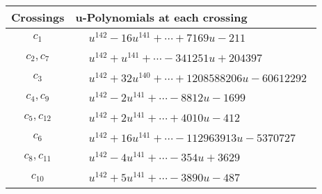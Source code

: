 \documentclass[1p]{elsarticle_modified}
\theoremstyle{definition}
\begin{document}
\begin{tabular}{m{50pt}|m{274pt}}
Crossings & \hspace{64pt}u-Polynomials at each crossing \\
\hline $$\begin{aligned}c_{1}\end{aligned}$$&$\begin{aligned}
&u^{142}-16 u^{141}+\cdots+7169 u-211
\end{aligned}$\\
\hline $$\begin{aligned}c_{2},c_{7}\end{aligned}$$&$\begin{aligned}
&u^{142}+u^{141}+\cdots-341251 u+204397
\end{aligned}$\\
\hline $$\begin{aligned}c_{3}\end{aligned}$$&$\begin{aligned}
&u^{142}+32 u^{140}+\cdots+1208588206 u-60612292
\end{aligned}$\\
\hline $$\begin{aligned}c_{4},c_{9}\end{aligned}$$&$\begin{aligned}
&u^{142}-2 u^{141}+\cdots-8812 u-1699
\end{aligned}$\\
\hline $$\begin{aligned}c_{5},c_{12}\end{aligned}$$&$\begin{aligned}
&u^{142}+2 u^{141}+\cdots+4010 u-412
\end{aligned}$\\
\hline $$\begin{aligned}c_{6}\end{aligned}$$&$\begin{aligned}
&u^{142}+16 u^{141}+\cdots-112963913 u-5370727
\end{aligned}$\\
\hline $$\begin{aligned}c_{8},c_{11}\end{aligned}$$&$\begin{aligned}
&u^{142}-4 u^{141}+\cdots-354 u+3629
\end{aligned}$\\
\hline $$\begin{aligned}c_{10}\end{aligned}$$&$\begin{aligned}
&u^{142}+5 u^{141}+\cdots-3890 u-487
\end{aligned}$\\
\hline
\end{tabular}\\~\\
\end{document}
